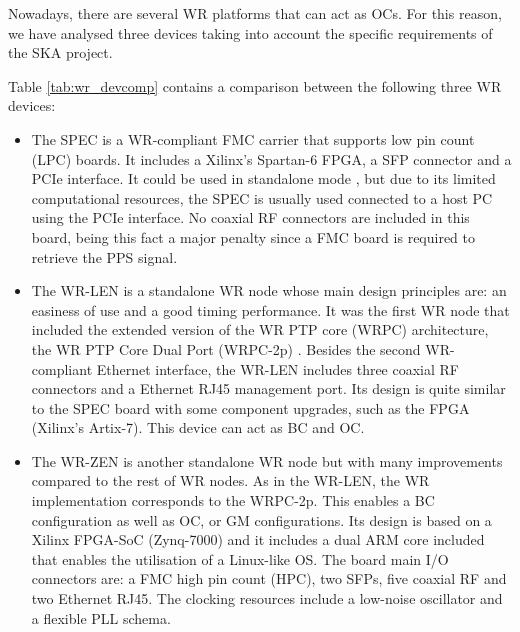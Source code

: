 Nowadays, there  are several WR platforms that can act as OCs. 
For this reason, we have analysed three devices taking into account the specific requirements of the SKA project.

Table \ref{tab:wr_devcomp} contains a comparison between the following three WR
devices: 

\begin{itemize} 
	\item The SPEC \cite{ohwr:spec} is a WR-compliant FMC carrier that supports low pin count (LPC) boards. It includes a Xilinx's Spartan-6 FPGA, a SFP connector and a PCIe interface. It could be used in standalone mode \cite{migueljl-paper-wr-spec}, but due to its limited computational resources, the SPEC is usually used connected to a host PC using the PCIe interface.  No coaxial RF connectors are included in this board, being this fact a major penalty since a FMC board is required to retrieve the PPS signal.
	
	\item The WR-LEN \cite{sevensols:wr_len} is a standalone WR node whose main design principles are: an easiness of use and a good timing performance. It was the first WR node	that included the extended version of the WR PTP core (WRPC) architecture, the WR PTP Core Dual Port (WRPC-2p) \cite{torres2016scalability}. Besides the second WR-compliant Ethernet interface, the WR-LEN includes three coaxial RF
	connectors and a Ethernet RJ45 management port. Its design is quite similar to the SPEC board with some component upgrades, such as the FPGA (Xilinx's Artix-7). This device can act as BC and OC.
	
	\item The WR-ZEN \cite{sevensols:wr_zen} is another
	standalone WR node but with many improvements compared to the rest of WR nodes. As in the WR-LEN, the WR implementation corresponds to the WRPC-2p.  This enables a BC configuration as well as OC, or GM configurations. Its design is based on a Xilinx FPGA-SoC (Zynq-7000) and it includes a dual ARM core included that enables the utilisation of a Linux-like	OS. The board main I/O connectors are: a FMC high pin count (HPC), two SFPs, five coaxial RF and two Ethernet RJ45. The clocking resources include a low-noise oscillator and a flexible PLL schema.
\end{itemize}

